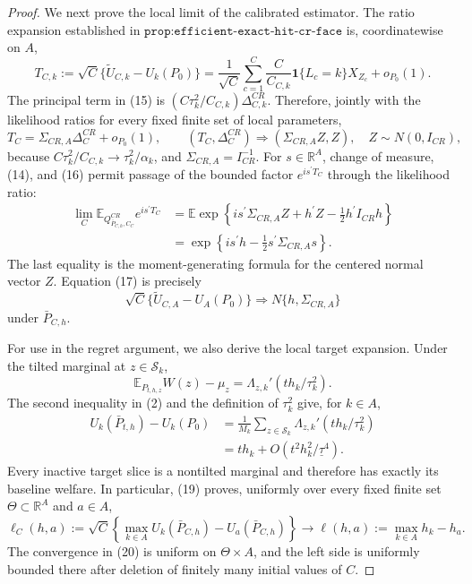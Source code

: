 \documentclass{article}
\begin{document}
\begin{proof}
We next prove the local limit of the calibrated estimator.  The ratio expansion established in \(\texttt{prop:efficient-exact-hit-cr-face}\) is, coordinatewise on \(A\),
\[
 T_{C,k}:=\sqrt C\{\widetilde U_{C,k}-U_k(P_0)\}
 =\frac1{\sqrt C}\sum_{c=1}^C
   \frac{C}{C_{C,k}}\mathbf1\{L_c=k\}X_{Z_c}+o_{P_0}(1).        \tag{15}
\]
The principal term in (15) is
\((C\tau_k^2/C_{C,k})\Delta_{C,k}^{CR}\).  Therefore, jointly with the likelihood ratios for every fixed finite set of local parameters,
\[
 T_C=\Sigma_{CR,A}\Delta_C^{CR}+o_{P_0}(1),
 \qquad
 (T_C,\Delta_C^{CR})\Rightarrow
 (\Sigma_{CR,A}Z,Z),\quad Z\sim N(0,I_{CR}),                    \tag{16}
\]
because \(C\tau_k^2/C_{C,k}\to\tau_k^2/\alpha_k\), and \(\Sigma_{CR,A}=I_{CR}^{-1}\).  For \(s\in\mathbb R^A\), change of measure, (14), and (16) permit passage of the bounded factor \(e^{is^{\prime}T_C}\) through the likelihood ratio:
\[
 \begin{aligned}
 \lim_C\mathbb E_{Q^{CR}_{\bar P_{C,h},C_C}}e^{is^{\prime}T_C}
 &=\mathbb E\exp\!\left\{is^{\prime}\Sigma_{CR,A}Z
                   +h^{\prime}Z-\frac{1}{2}h^{\prime}I_{CR}h\right\}\\
 &=\exp\!\left\{is^{\prime}h-\frac{1}{2}s^{\prime}\Sigma_{CR,A}s\right\}.
 \end{aligned}                                                   \tag{17}
\]
The last equality is the moment-generating formula for the centered normal vector \(Z\).  Equation (17) is precisely
\[
 \sqrt C\{\widetilde U_{C,A}-U_A(P_0)\}
 \Rightarrow N\{h,\Sigma_{CR,A}\}                              \tag{18}
\]
under \(\bar P_{C,h}\).

For use in the regret argument, we also derive the local target expansion.  Under the tilted marginal at \(z\in\mathcal S_k\),
\[
 \mathbb E_{P_{t,h,z}}W(z)-\mu_z
 =\Lambda_{z,k}'(t h_k/\tau_k^2).
\]
The second inequality in (2) and the definition of \(\tau_k^2\) give, for \(k\in A\),
\[
 \begin{aligned}
 U_k(\bar P_{t,h})-U_k(P_0)
 &=\frac1{M_k}\sum_{z\in\mathcal S_k}
   \Lambda_{z,k}'(t h_k/\tau_k^2)\\
 &=t h_k+O(t^2h_k^2/\underline\tau^4).                          
 \end{aligned}                                                   \tag{19}
\]
Every inactive target slice is a nontilted marginal and therefore has exactly its baseline welfare.  In particular, (19) proves, uniformly over every fixed finite set \(\Theta\subset\mathbb R^A\) and \(a\in A\),
\[
 \ell_C(h,a):=\sqrt C\!\left\{
   \max_{k\in A}U_k(\bar P_{C,h})-U_a(\bar P_{C,h})\right\}
 \longrightarrow
 \ell(h,a):=\max_{k\in A}h_k-h_a.                              \tag{20}
\]
The convergence in (20) is uniform on \(\Theta\times A\), and the left side is uniformly bounded there after deletion of finitely many initial values of \(C\).


\end{proof}
\end{document}
